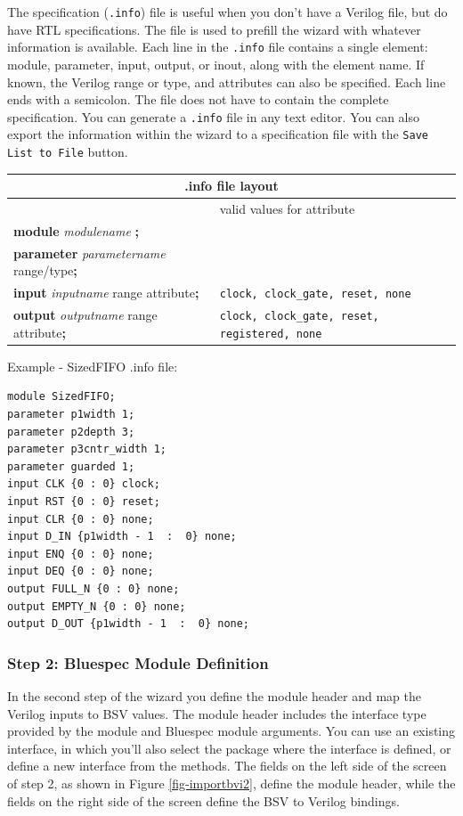 \documentclass{article}
\newcommand{\te}[1]{\texttt{#1}}
\begin{document}
The specification (\te{.info}) file is useful when you don't have a
 Verilog file, but do have RTL specifications.  The file is used
 to prefill the wizard with whatever
 information  is available. Each line in the \te{.info}
 file contains a single element: module,
parameter, input, output, or inout, along with the element name.  If known,
the Verilog range or type, and attributes can also be specified. Each line ends
with a semicolon.   The file does not have to contain the complete
 specification.  You can generate a \te{.info} file in any text
 editor.  You can also export the information within the wizard to
 a specification file with the \te{Save List to File} button.




\begin{tabular}{|l|l|}
\hline
\multicolumn{2}{|c|}{.info file layout} \\
\hline
&valid values for attribute\\
\hline
{\bf module} \emph{modulename} {\bf ;}&\\
{\bf parameter} \emph{parametername} range/type{\bf ;}&\\
{\bf input} \emph{inputname} range attribute{\bf ;}&\te{clock, clock\_gate, reset, none}\\
{\bf output} \emph{outputname} range attribute{\bf ;}&\te{clock, clock\_gate,
reset, registered, none}\\
\hline
\end{tabular}


Example - SizedFIFO .info file:

\begin{verbatim}
module SizedFIFO;
parameter p1width 1;
parameter p2depth 3;
parameter p3cntr_width 1;
parameter guarded 1;
input CLK {0 : 0} clock;
input RST {0 : 0} reset;
input CLR {0 : 0} none;
input D_IN {p1width - 1  :  0} none;
input ENQ {0 : 0} none;
input DEQ {0 : 0} none;
output FULL_N {0 : 0} none;
output EMPTY_N {0 : 0} none;
output D_OUT {p1width - 1  :  0} none;
\end{verbatim}


\subsubsection{Step 2: Bluespec Module Definition}

In the second step of the wizard you define the module  header and map
the Verilog inputs  to BSV values.  The module
header includes the interface type provided by the module and Bluespec
module arguments.  You can use an
existing interface, in which you'll also select the package where the
interface is defined, or define a new interface from the methods.
The fields on the left side of the screen of step 2,  as shown in
Figure \ref{fig-importbvi2},  define the module
header, while the fields on the right side of the screen define the
BSV to Verilog bindings.
\end{document}
